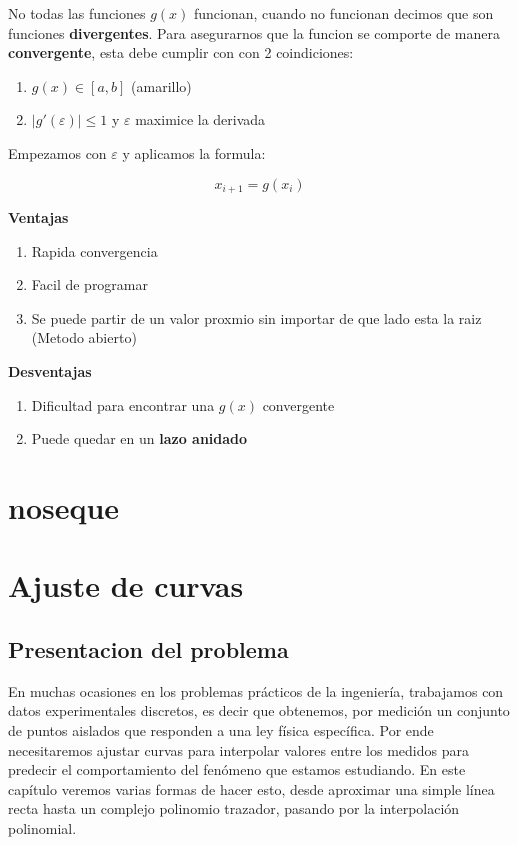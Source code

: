 \documentclass[10pt]{article}
\begin{document}
No todas las funciones $g(x)$ funcionan, cuando no funcionan decimos
que son funciones \textbf{divergentes}. Para asegurarnos que la funcion
se comporte de manera \textbf{convergente}, esta debe cumplir con con 2 coindiciones:

\begin{enumerate}
	\item $g(x) \in [a, b]$ (amarillo)
	\item $|g'(\varepsilon)| \leq 1$ y $\varepsilon$ maximice la derivada
\end{enumerate}

Empezamos con $\varepsilon$ y aplicamos la formula:

\begin{equation}
	x_{i+1} = g(x_i)
\end{equation}

\textbf{Ventajas}

\begin{enumerate}
	\item Rapida convergencia
	\item Facil de programar
	\item Se puede partir de un valor proxmio sin importar de que lado esta la raiz (Metodo abierto)
\end{enumerate}

\textbf{Desventajas}

\begin{enumerate}
	\item Dificultad para encontrar una $g(x)$ convergente
	\item Puede quedar en un \textbf{lazo anidado}
\end{enumerate}

\section{noseque}

\section{Ajuste de curvas}

\subsection{Presentacion del problema}

En muchas ocasiones en los problemas prácticos de la ingeniería, trabajamos con
datos experimentales discretos, es decir que obtenemos, por medición un conjunto de
puntos aislados que responden a una ley física específica. Por ende necesitaremos ajustar
curvas para interpolar valores entre los medidos para predecir el comportamiento del
fenómeno que estamos estudiando.
En este capítulo veremos varias formas de hacer esto, desde aproximar una simple
línea recta hasta un complejo polinomio trazador, pasando por la interpolación
polinomial.
\end{document}
